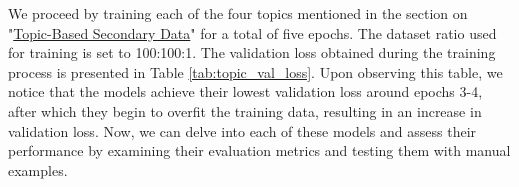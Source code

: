 \begin{table}[ht]
    \centering
    \vspace{5pt}
    \caption{Validation loss collected during training across 5 epochs for each topic}
    \label{tab:topic_val_loss}
\end{table}

We proceed by training each of the four topics mentioned in the section on "\hyperref[topic_based_sec_data]{Topic-Based Secondary Data}" for a total of five epochs. The dataset ratio used for training is set to 100:100:1. The validation loss obtained during the training process is presented in Table \ref{tab:topic_val_loss}. Upon observing this table, we notice that the models achieve their lowest validation loss around epochs 3-4, after which they begin to overfit the training data, resulting in an increase in validation loss. Now, we can delve into each of these models and assess their performance by examining their evaluation metrics and testing them with manual examples.

